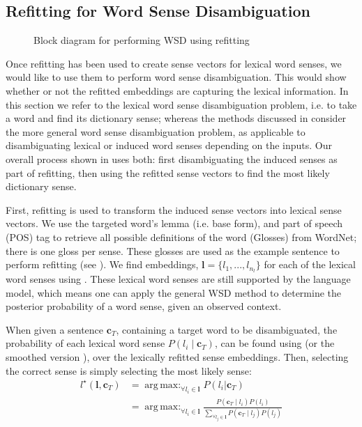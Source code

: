 \documentclass{llncs}
\renewcommand{\c}{\mathbf{c}}
\renewcommand{\l}{\mathbf{l}}
\DeclareMathOperator*{\argmax}{arg\,max:}
\begin{document}
\subsection{Refitting for Word Sense Disambiguation} 
\begin{figure}
	\begin{adjustbox}{max width=\columnwidth}
		
	\end{adjustbox}
	\caption{Block diagram for performing WSD using refitting \label{WSDBlock}} 
\end{figure}
Once refitting has been used to create sense vectors for lexical word senses, we would like to use them to perform word sense disambiguation.
This would show whether or not the refitted embeddings are capturing the lexical information.
In this section we refer to the lexical word sense disambiguation problem, i.e. to take a word and find its dictionary sense;
whereas the methods discussed in  consider the more general word sense disambiguation problem, as applicable to disambiguating lexical or induced word senses depending on the inputs.
Our overall process shown in  uses both: first disambiguating the induced senses as part of refitting, then using the refitted sense vectors to find the most likely dictionary sense.

First, refitting is used to transform the induced sense vectors into lexical sense vectors.
We use the targeted word's lemma (i.e. base form), and part of speech (POS) tag to retrieve all possible definitions of the word (Glosses) from WordNet; there is one gloss per sense.
These glosses are used as the example sentence to perform refitting (see ).
We find embeddings, $\l=\{l_1,..., l_{n_l}\}$ for each of the lexical word senses using .
These lexical word senses are still supported by the language model, which means one can apply the general WSD method to determine the posterior probability of a word sense, given an observed context. 

When given a sentence $\c_{T}$, containing a target word to be disambiguated, 
the probability of each lexical word sense $P(l_i \mid \c_{T})$, can be found using  (or the smoothed version ), over the lexically refitted sense embeddings.
Then, selecting the correct sense is simply selecting the most likely sense:
\begin{equation}
\begin{aligned}\label{eq:lexicalwsd}
l^\star (\l, \c_T) &= \argmax_{\forall l_i \in \l} P(l_i|\c_T) \\
&= \argmax_{\forall l_i \in \l} \frac{P(\c_T \mid l_i)P(l_i)}{\sum_{\forall l_j \in \l} P(\c_T \mid l_j)P(l_j)}
\end{aligned}
\end{equation}
\end{document}
